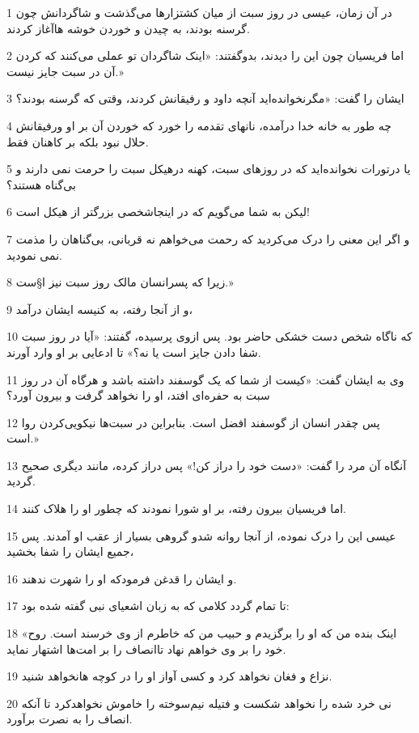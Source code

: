 \par 1 در آن زمان، عیسی در روز سبت از میان کشتزارها می‌گذشت و شاگردانش چون گرسنه بودند، به چیدن و خوردن خوشه هاآغاز کردند.
\par 2 اما فریسیان چون این را دیدند، بدوگفتند: «اینک شاگردان تو عملی می‌کنند که کردن آن در سبت جایز نیست.»
\par 3 ایشان را گفت: «مگرنخوانده‌اید آنچه داود و رفیقانش کردند، وقتی که گرسنه بودند؟
\par 4 چه طور به خانه خدا در‌آمده، نانهای تقدمه را خورد که خوردن آن بر او ورفیقانش حلال نبود بلکه بر کاهنان فقط.
\par 5 یا درتورات نخوانده‌اید که در روزهای سبت، کهنه درهیکل سبت را حرمت نمی دارند و بی‌گناه هستند؟
\par 6 لیکن به شما می‌گویم که در اینجاشخصی بزرگتر از هیکل است!
\par 7 و اگر این معنی را درک می‌کردید که رحمت می‌خواهم نه قربانی، بی‌گناهان را مذمت نمی نمودید.
\par 8 زیرا که پسرانسان مالک روز سبت نیز ا§ست.»
\par 9 و از آنجا رفته، به کنیسه ایشان درآمد،
\par 10 که ناگاه شخص دست خشکی حاضر بود. پس ازوی پرسیده، گفتند: «آیا در روز سبت شفا دادن جایز است یا نه؟» تا ادعایی بر او وارد آورند.
\par 11 وی به ایشان گفت: «کیست از شما که یک گوسفند داشته باشد و هرگاه آن در روز سبت به حفره‌ای افتد، او را نخواهد گرفت و بیرون آورد؟
\par 12 پس چقدر انسان از گوسفند افضل است. بنابراین در سبت‌ها نیکویی‌کردن روا است.»
\par 13 آنگاه آن مرد را گفت: «دست خود را دراز کن!» پس دراز کرده، مانند دیگری صحیح گردید.
\par 14 اما فریسیان بیرون رفته، بر او شورا نمودند که چطور او را هلاک کنند.
\par 15 عیسی این را درک نموده، از آنجا روانه شدو گروهی بسیار از عقب او آمدند. پس جمیع ایشان را شفا بخشید،
\par 16 و ایشان را قدغن فرمودکه او را شهرت ندهند.
\par 17 تا تمام گردد کلامی که به زبان اشعیای نبی گفته شده بود:
\par 18 «اینک بنده من که او را برگزیدم و حبیب من که خاطرم از وی خرسند است. روح خود را بر وی خواهم نهاد تاانصاف را بر امت‌ها اشتهار نماید.
\par 19 نزاع و فغان نخواهد کرد و کسی آواز او را در کوچه هانخواهد شنید.
\par 20 نی خرد شده را نخواهد شکست و فتیله نیم‌سوخته را خاموش نخواهدکرد تا آنکه انصاف را به نصرت برآورد.
